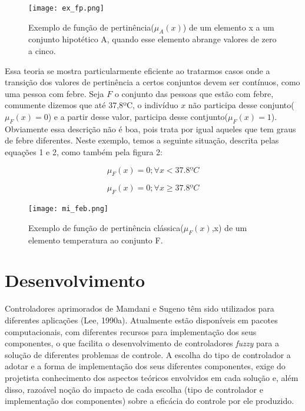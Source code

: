 \documentclass[conference]{IEEEtran}
\begin{document}
\begin{figure}[!ht]
    \centering
    \texttt{[image: ex\_fp.png]}
    \caption { Exemplo de função de pertinência($\mu_A(x)$) de um elemento x a um conjunto hipotético A, quando esse elemento abrange valores de zero a cinco. }
\end{figure}

Essa teoria se mostra particularmente eficiente ao tratarmos casos onde a transição dos valores de pertinência a certos conjuntos devem ser contínuos, como uma pessoa com febre. Seja $F$ o conjunto das pessoas que estão com febre, comumente dizemos que até 37,8ºC, o indivíduo $x$ não participa desse conjunto($\mu_F(x) = 0$) e a partir desse valor, participa desse contjunto($\mu_F(x) = 1$). Obviamente essa descrição não é boa, pois trata por igual aqueles que tem graus de febre diferentes. Neste exemplo, temos a seguinte situação, descrita pelas equações 1 e 2, como também pela figura 2:

\begin{equation}
\mu_F(x) = 0; \forall x < 37.8 ºC
\end{equation}

\begin{equation}
\mu_F(x) = 0; \forall x \geq 37.8 ºC
\end{equation}

\begin{figure}[!ht]
    \centering
    \texttt{[image: mi\_feb.png]}
    \caption { Exemplo de função de pertinência clássica($\mu_F(x)$,x) de um elemento temperatura ao conjunto F. }
\end{figure}

\section{Desenvolvimento}

Controladores aprimorados de Mamdani e Sugeno têm sido utilizados para diferentes aplicações (Lee, 1990a). Atualmente estão disponíveis em pacotes computacionais, com diferentes recursos para implementação dos seus componentes, o que facilita o desenvolvimento de controladores \textit{fuzzy} para a solução de diferentes problemas de controle. A escolha do tipo de controlador a adotar e a forma de implementação dos seus diferentes componentes, exige do projetista conhecimento dos aspectos teóricos envolvidos em cada solução e, além disso, razoável noção do impacto de cada escolha (tipo de controlador e implementação dos componentes) sobre a eficácia do controle por ele produzido.
\end{document}

